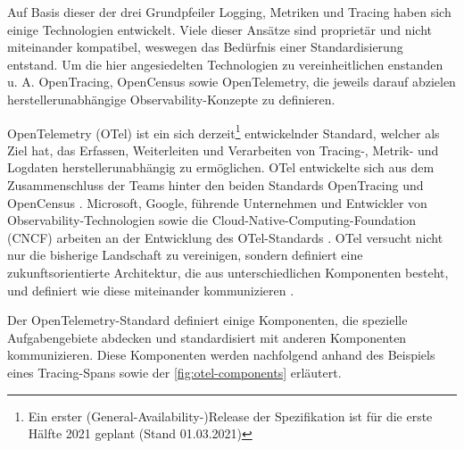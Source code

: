 
Auf Basis dieser der drei Grundpfeiler Logging, Metriken und Tracing haben sich einige Technologien entwickelt. Viele dieser Ansätze sind proprietär und nicht miteinander kompatibel, weswegen das Bedürfnis einer Standardisierung entstand. Um die hier angesiedelten Technologien zu vereinheitlichen enstanden u. A. OpenTracing, OpenCensus \cite{OpenCensus} sowie OpenTelemetry, die jeweils darauf abzielen herstellerunabhängige Observability-Konzepte zu definieren.

OpenTelemetry (OTel) ist ein sich derzeit\footnote{Ein erster (General-Availability-)Release der Spezifikation ist für die erste Hälfte 2021 geplant \cite{OpenTelemetryGARelease} (Stand 01.03.2021)} entwickelnder Standard, welcher als Ziel hat, das Erfassen, Weiterleiten und Verarbeiten von Tracing-, Metrik- und Logdaten\footnotemark{} herstellerunabhängig zu ermöglichen. OTel entwickelte sich aus dem Zusammenschluss der Teams hinter den beiden Standards OpenTracing und OpenCensus  \cite{UseNixDistributiveTracing}. Microsoft, Google, führende Unternehmen und Entwickler von Observability-Technologien sowie die Cloud-Native-Computing-Foundation (CNCF) arbeiten an der Entwicklung des OTel-Standards \cite{DistributedTracingInPractice} \cite{OpenTelemetryCommunityMembers}. OTel versucht nicht nur die bisherige Landschaft zu vereinigen, sondern definiert eine zukunftsorientierte Architektur, die aus unterschiedlichen Komponenten besteht, und definiert wie diese miteinander kommunizieren \cite{DistributedTracingInPractice}.


Der OpenTelemetry-Standard definiert einige Komponenten, die spezielle Aufgabengebiete abdecken und standardisiert mit anderen Komponenten kommunizieren. Diese Komponenten werden nachfolgend anhand des Beispiels eines Tracing-Spans sowie der \autoref{fig:otel-components} erläutert.

